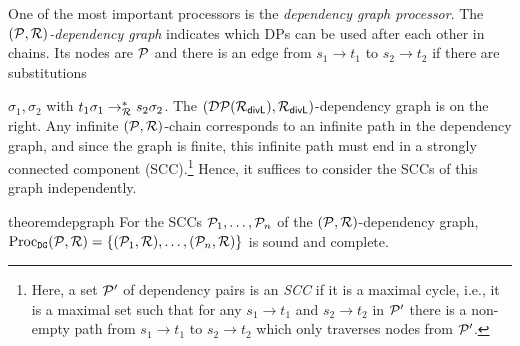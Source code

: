 One of the most important processors is the \emph{dependency graph processor}.
The \emph{$(\mathcal{P}, \mathcal{R})$-dependency graph} indicates
which DPs can be used after each other in  
chains.\linebreak
Its nodes are $\mathcal{P}$ and there is an edge from $s_1 \to t_1$ to $s_2 \to t_2$ if there
are substitutions
\begin{wrapfigure}[5]{r}{0.14\textwidth}
  \begin{center}
  \scriptsize
    \vspace*{-1.3cm}
    \caption*{}
  \end{center}
\end{wrapfigure}
$\sigma_1, \sigma_2$ with $t_1 \sigma_1 \to_{\mathcal{R}}^* s_2 \sigma_2$.
The $(\mathcal{DP}(\mathcal{R}_{\mathsf{divL}}), \mathcal{R}_{\mathsf{divL}})$-dependency graph is on the right.
Any infinite $(\mathcal{P}, \mathcal{R})$-chain corresponds to
an infinite path in the dependency graph, and since the graph is finite, this infinite
path must end in a strongly connected component (SCC).\footnote{Here, a
set $\mathcal{P}'$ of dependency pairs is  an \emph{SCC} if it is a maximal cycle,
i.e., it is a maximal set such that for any $s_1 \to t_1$ and $s_2 \to
t_2$ in $\mathcal{P}'$ there is
a non-empty path from $s_1 \to t_1$ to $s_2 \to
t_2$ which only traverses nodes from $\mathcal{P}'$.}
Hence, it suffices to consider the SCCs of this graph independently.

\begin{restatable}{theorem}{depgraph}\label{DGP}
    For the SCCs $\mathcal{P}_1, \ldots, \mathcal{P}_n$ of the $(\mathcal{P}, \mathcal{R})$-dependency graph,  
    $\operatorname{Proc}_{\mathtt{DG}}(\mathcal{P},\mathcal{R}) = \{(\mathcal{P}_1,\mathcal{R}), \ldots, (\mathcal{P}_n,\mathcal{R})\}$ is sound and complete. 
\end{restatable}

